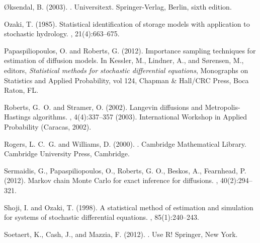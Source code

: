 \documentclass[oneside,11pt]{article}
\begin{document}
\begin{thebibliography}{}
	{\O}ksendal, B. (2003).
	.
	\newblock Universitext. Springer-Verlag, Berlin, sixth edition.
	
	Ozaki, T. (1985).
	\newblock Statistical identification of storage models with application to
	stochastic hydrology.
	, 21(4):663--675.
	
	Papaspiliopoulos, O. and Roberts, G. (2012).
	\newblock Importance sampling techniques for
estimation of diffusion models. 
	\newblock In Kessler, M., Lindner, A., and S{\o}rensen, M., editors, {\em Statistical methods for stochastic differential equations}, Monographs on Statistics and Applied Probability, vol 124, Chapman \& Hall/CRC Press, Boca Raton, FL.
	
	Roberts, G.~O. and Stramer, O. (2002).
	\newblock Langevin diffusions and {M}etropolis-{H}astings algorithms.
	, 4(4):337--357 (2003).
	\newblock International Workshop in Applied Probability (Caracas, 2002).
	
	Rogers, L. C.~G. and Williams, D. (2000).
	.
	\newblock Cambridge Mathematical Library. Cambridge University Press,
	Cambridge.
	
	Sermaidis, G., Papaspiliopoulos, O., Roberts, G. O., Beskos, A., Fearnhead, P. (2012).
	\newblock Markov chain Monte Carlo for exact inference for diffusions. 
	, 40(2):294--321.
	
	Shoji, I. and Ozaki, T. (1998).
	\newblock A statistical method of estimation and simulation for systems of
	stochastic differential equations.
	, 85(1):240--243.
	
	Soetaert, K., Cash, J., and Mazzia, F. (2012).
	.
	\newblock Use R! Springer, New York.
	

\end{thebibliography}
\end{document}
